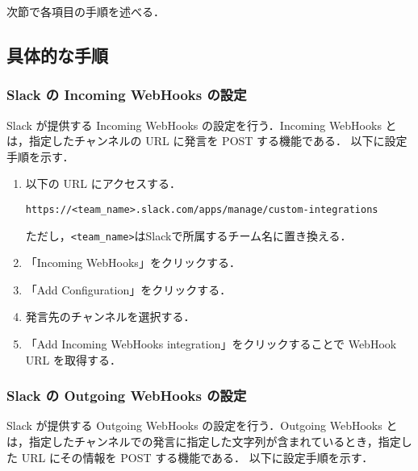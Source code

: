 \documentclass[12pt]{jsarticle}
\begin{document}
次節で各項目の手順を述べる．
\subsection{具体的な手順}
\subsubsection{Slack の Incoming WebHooks の設定}
Slack が提供する Incoming WebHooks の設定を行う．Incoming WebHooks とは，指定したチャンネルの URL に発言を POST する機能である．
以下に設定手順を示す．

\begin{enumerate}
  \item 以下の URL にアクセスする．

    \verb|https://<team_name>.slack.com/apps/manage/custom-integrations|

    ただし，\verb|<team_name>|はSlackで所属するチーム名に置き換える．
　　
  \item 「Incoming WebHooks」をクリックする． 
  \item 「Add Configuration」をクリックする．
  \item 発言先のチャンネルを選択する．
  \item 「Add Incoming WebHooks integration」をクリックすることで WebHook URL を取得する．
\end{enumerate}

\subsubsection{Slack の Outgoing WebHooks の設定}
Slack が提供する Outgoing WebHooks の設定を行う．Outgoing WebHooks とは，指定したチャンネルでの発言に指定した文字列が含まれているとき，指定した URL にその情報を POST する機能である．
以下に設定手順を示す．
\end{document}
